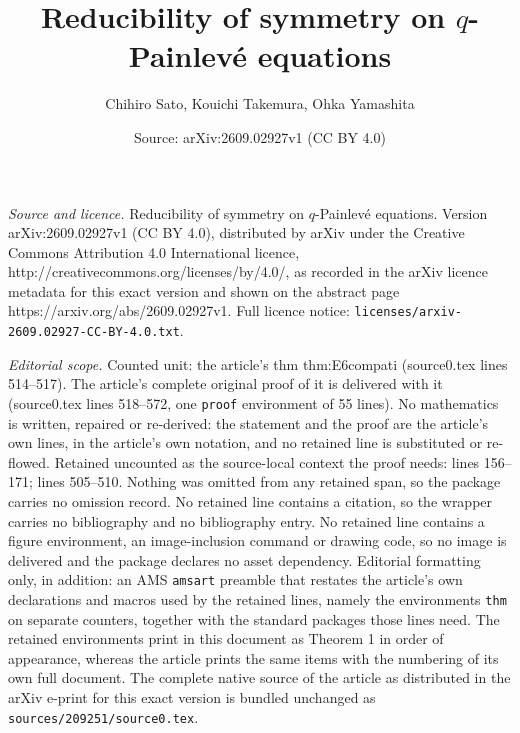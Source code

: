 \documentclass[10pt,a4paper]{amsart}
\title{Reducibility of symmetry on $q$-Painlev\'e equations}
\author{Chihiro Sato, Kouichi Takemura, Ohka Yamashita}
\date{Source: arXiv:2609.02927v1 (CC BY 4.0)}
\begin{document}
\maketitle

\noindent\emph{Source and licence.} Reducibility of symmetry on $q$-Painlev\'e equations. Version arXiv:2609.02927v1 (CC BY 4.0), distributed by arXiv under the Creative Commons Attribution 4.0 International licence, http://creativecommons.org/licenses/by/4.0/, as recorded in the arXiv licence metadata for this exact version and shown on the abstract page https://arxiv.org/abs/2609.02927v1. Full licence notice: \texttt{licenses/arxiv-2609.02927-CC-BY-4.0.txt}.\par\smallskip

\noindent\textit{Editorial scope.} Counted unit: the article's thm thm:E6compati (source0.tex lines 514--517). The article's complete original proof of it is delivered with it (source0.tex lines 518--572, one \texttt{proof} environment of 55 lines). No mathematics is written, repaired or re-derived: the statement and the proof are the article's own lines, in the article's own notation, and no retained line is substituted or re-flowed.  Retained uncounted as the source-local context the proof needs: lines 156--171; lines 505--510.  Nothing was omitted from any retained span, so the package carries no omission record.  No retained line contains a citation, so the wrapper carries no bibliography and no bibliography entry.  No retained line contains a figure environment, an image-inclusion command or drawing code, so no image is delivered and the package declares no asset dependency.  Editorial formatting only, in addition: an AMS \texttt{amsart} preamble that restates the article's own declarations and macros used by the retained lines, namely the environments \texttt{thm} on separate counters, together with the standard packages those lines need.  The retained environments print in this document as Theorem 1 in order of appearance, whereas the article prints the same items with the numbering of its own full document.  The complete native source of the article as distributed in the arXiv e-print for this exact version is bundled unchanged as \texttt{sources/209251/source0.tex}.
\end{document}
